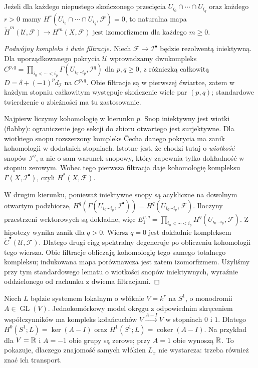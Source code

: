 \begin{twierdzenie}
\label{thm:leray-sheaf-v12}
Jeżeli dla każdego niepustego skończonego przecięcia
$U_{i_0}\cap\cdots\cap U_{i_q}$ oraz każdego $r>0$ mamy
$H^r(U_{i_0}\cap\cdots\cap U_{i_q},\mathcal F)=0$,
to naturalna mapa
$\check H^m(\mathcal U,\mathcal F)\to H^m(X,\mathcal F)$
jest izomorfizmem dla każdego $m\ge0$.
\end{twierdzenie}
\begin{proof}[Podwójny kompleks i dwie filtracje]
Niech $\mathcal F\to\mathcal I^\bullet$ będzie rezolwentą
iniektywną. Dla uporządkowanego pokrycia $\mathcal U$
wprowadzamy dwukompleks
$C^{p,q}=\prod_{i_0<\cdots<i_p}
\Gamma(U_{i_0\cdots i_p},\mathcal I^q)$ dla $p,q\ge0$,
z różniczką całkowitą
$D=\delta+(-1)^p d_{\mathcal I}$ na $C^{p,q}$.
Obie filtracje są w pierwszej ćwiartce, zatem w każdym
stopniu całkowitym występuje skończenie wiele par $(p,q)$;
standardowe twierdzenie o zbieżności ma tu zastosowanie.

Najpierw liczymy kohomologię w kierunku $p$. Snop
iniektywny jest wiotki (flabby): ograniczenie jego sekcji
do zbioru otwartego jest surjektywne. Dla wiotkiego snopu
rozszerzony kompleks \v{C}echa danego pokrycia ma
zanik kohomologii w dodatnich stopniach. Istotne jest,
że chodzi tutaj o \emph{wiotkość} snopów $\mathcal I^q$,
a nie o sam warunek snopowy, który zapewnia tylko
dokładność w stopniu zerowym. Wobec tego pierwsza
filtracja daje kohomologię kompleksu
$\Gamma(X,\mathcal I^\bullet)$, czyli $H^*(X,\mathcal F)$.

W drugim kierunku, ponieważ iniektywne snopy są
acykliczne na dowolnym otwartym podzbiorze,
$H^q(\Gamma(U_{i_0\cdots i_p},\mathcal I^\bullet))
=H^q(U_{i_0\cdots i_p},\mathcal F)$.
Iloczyny przestrzeni wektorowych są dokładne,
więc $E_1^{p,q}=\prod_{i_0<\cdots<i_p}
H^q(U_{i_0\cdots i_p},\mathcal F)$.
Z hipotezy wynika zanik dla $q>0$.
Wiersz $q=0$ jest dokładnie kompleksem
$\check C^\bullet(\mathcal U,\mathcal F)$.
Dlatego drugi ciąg spektralny degeneruje po obliczeniu
kohomologii tego wiersza. Obie filtracje obliczają
kohomologię tego samego totalnego kompleksu;
indukowana mapa porównawcza jest zatem izomorfizmem.
Użyliśmy przy tym standardowego lematu o wiotkości
snopów iniektywnych, wyraźnie oddzielonego od rachunku
z dwiema filtracjami.
\end{proof}

\begin{przyklad}
Niech $L$ będzie systemem lokalnym o włóknie $V=k^r$
na $S^1$, o monodromii $A\in\operatorname{GL}(V)$.
Jednokomórkowy model okręgu z odpowiednim skręceniem
współczynników ma kompleks kołańcuchów
$V\xrightarrow{A-I}V$ w stopniach $0$ i $1$.
Dlatego
$H^0(S^1;L)=\ker(A-I)$ oraz
$H^1(S^1;L)=\operatorname{coker}(A-I)$.
Na przykład dla $V=\mathbb{R}$ i $A=-1$ obie grupy są zerowe;
przy $A=1$ obie wynoszą $\mathbb{R}$.
To pokazuje, dlaczego znajomość samych włókien $L_x$
nie wystarcza: trzeba również znać ich transport.
\end{przyklad}

